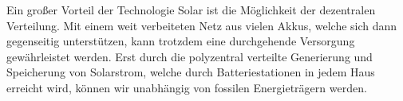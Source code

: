  Ein großer Vorteil der Technologie Solar ist die Möglichkeit der dezentralen Verteilung. Mit einem weit verbeiteten Netz aus vielen Akkus, welche sich dann gegenseitig unterstützen, kann trotzdem eine durchgehende Versorgung gewährleistet werden. Erst durch die polyzentral verteilte Generierung und Speicherung von Solarstrom, welche durch Batteriestationen in jedem Haus erreicht wird, können wir unabhängig von fossilen Energieträgern werden.\\
